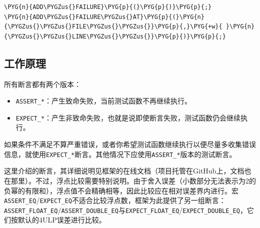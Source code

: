 \begin{itemize}
\begin{codeblockbg}
\begin{Verbatim}[commandchars=\\\{\},breaklines=true,breakanywhere=true,fontsize=\codefont,xleftmargin=17bp]
\PYG{n}{ADD\PYGZus{}FAILURE}\PYG{p}{(}\PYG{p}{)}\PYG{p}{;}
\PYG{n}{ADD\PYGZus{}FAILURE\PYGZus{}AT}\PYG{p}{(}\PYG{n}{\PYGZus{}\PYGZus{}FILE\PYGZus{}\PYGZus{}}\PYG{p}{,}\PYG{+w}{ }\PYG{n}{\PYGZus{}\PYGZus{}LINE\PYGZus{}\PYGZus{}}\PYG{p}{)}\PYG{p}{;}
\end{Verbatim}
\end{codeblockbg}

\end{itemize}



\subsection{工作原理}



所有断言都有两个版本：



\begin{itemize}
\item \texttt{ASSERT\_\allowbreak{}*}：产生致命失败，当前测试函数不再继续执行。



\item \texttt{EXPECT\_\allowbreak{}*}：产生非致命失败，也就是说即使断言失败，测试函数仍会继续执行。

\end{itemize}



如果条件不满足不算严重错误，或者你希望测试函数继续执行以便尽量多收集错误信息，就使用\texttt{EXPECT\_\allowbreak{}*}断言。其他情况下应使用\texttt{ASSERT\_\allowbreak{}*}版本的测试断言。



这里介绍的断言，其详细说明见框架的在线文档（项目托管在GitHub上，文档也在那里）。不过，浮点比较需要特别说明。由于舍入误差（小数部分无法表示为2的负幂的有限和），浮点值不会精确相等，因此比较应在相对误差界内进行。宏\texttt{ASSERT\_\allowbreak{}EQ}/\texttt{EXPECT\_\allowbreak{}EQ}不适合比较浮点数，框架为此提供了另一组断言：\texttt{ASSERT\_\allowbreak{}FLOAT\_\allowbreak{}EQ}/\texttt{ASSERT\_\allowbreak{}DOUBLE\_\allowbreak{}EQ}与\texttt{EXPECT\_\allowbreak{}FLOAT\_\allowbreak{}EQ}/\texttt{EXPECT\_\allowbreak{}DOUBLE\_\allowbreak{}EQ}，它们按默认的4ULP误差进行比较。


